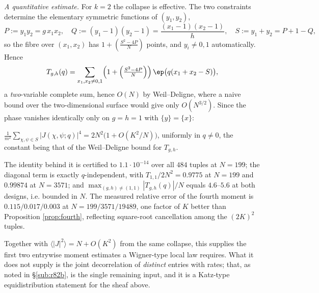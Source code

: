 \emph{A quantitative estimate.}  For $k=2$ the collapse is effective.  The two
constraints determine the elementary symmetric functions of $(y_1,y_2)$,
\[
  P:=y_1y_2=g\,x_1x_2,\quad
  Q:=(y_1-1)(y_2-1)=\frac{(x_1-1)(x_2-1)}{h},\quad
  S:=y_1+y_2=P+1-Q,
\]
so the fibre over $(x_1,x_2)$ has $1+\left(\tfrac{S^2-4P}{N}\right)$ points, and
$y_i\neq0,1$ automatically.  Hence
\[
  T_{g,h}(q)=\sum_{x_1,x_2\neq0,1}
    \Bigl(1+\Bigl(\tfrac{S^2-4P}{N}\Bigr)\Bigr)\,\ep\bigl(q(x_1+x_2-S)\bigr),
\]
a \emph{two}-variable complete sum, hence $O(N)$ by Weil--Deligne, where a naive
bound over the two-dimensional surface would give only $O(N^{3/2})$.  Since the
phase vanishes identically only on $g=h=1$ with $\{y\}=\{x\}$:

\begin{proposition}\label{prop:fourth}
$\displaystyle \frac1{m^2}\sum_{\chi,\psi\in S}|J(\chi,\psi;q)|^4
 = 2N^2\bigl(1+O(K^2/N)\bigr)$,
uniformly in $q\neq0$, the constant being that of the Weil--Deligne bound for
$T_{g,h}$.
\end{proposition}

The identity behind it is certified to $1.1\cdot10^{-14}$ over all $484$ tuples
at $N=199$; the diagonal term is exactly $q$-independent, with
$T_{1,1}/2N^2=0.9775$ at $N=199$ and $0.99874$ at $N=3571$; and
$\max_{(g,h)\neq(1,1)}|T_{g,h}(q)|/N$ equals $4.6$--$5.6$ at both designs, i.e.
bounded in $N$.  The measured relative error of the fourth moment is
$0.115/0.017/0.003$ at $N=199/3571/19489$, one factor of $K$ better than
Proposition \ref{prop:fourth}, reflecting square-root cancellation among the
$(2K)^2$ tuples.

Together with $\langle|J|^2\rangle=N+O(K^2)$ from the same collapse, this
supplies the first two entrywise moment estimates a Wigner-type local law
requires.  What it does not supply is the joint decorrelation of \emph{distinct}
entries with rates; that, as noted in \S\ref{sub:r82b}, is the single remaining
input, and it is a Katz-type equidistribution statement for the sheaf above.
